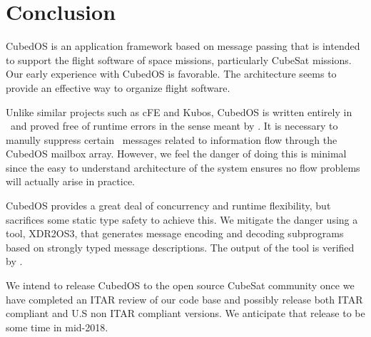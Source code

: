 
\section{Conclusion}

CubedOS is an application framework based on message passing that is intended to support the
flight software of space missions, particularly CubeSat missions. Our early experience with
CubedOS is favorable. The architecture seems to provide an effective way to organize
flight software.

Unlike similar projects such as cFE and Kubos, CubedOS is written entirely in \SPARK\ and proved
free of runtime errors in the sense meant by \SPARK. It is necessary to manully suppress certain
\SPARK\ messages related to information flow through the CubedOS mailbox array. However, we feel
the danger of doing this is minimal since the easy to understand architecture of the system
ensures no flow problems will actually arise in practice.

CubedOS provides a great deal of concurrency and runtime flexibility, but sacrifices some static
type safety to achieve this. We mitigate the danger using a tool, XDR2OS3, that generates
message encoding and decoding subprograms based on strongly typed message descriptions. The
output of the tool is verified by \SPARK.

We intend to release CubedOS to the open source CubeSat community once we have completed an ITAR
review of our code base  and possibly release both  ITAR compliant and U.S non ITAR compliant versions.
 We anticipate that release to be some time in mid-2018.
